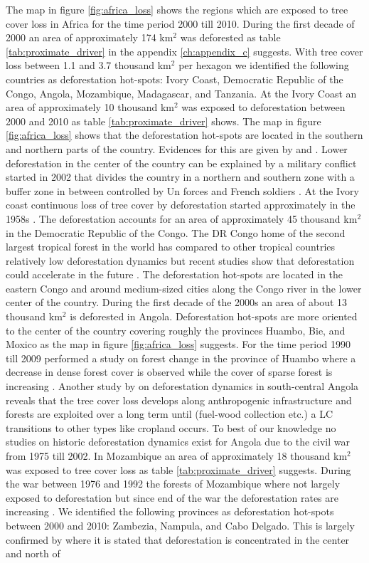 			The map in figure \ref{fig:africa_loss} shows the regions which are exposed to tree cover loss in Africa for the time period 2000 till 2010. During the first decade of 2000 an area of approximately 174 km$^2$ was deforested as table \ref{tab:proximate_driver} in the appendix \ref{ch:appendix_c} suggests. With tree cover loss between 1.1 and 3.7 thousand km$^2$ per hexagon we identified the following countries as deforestation hot-spots: Ivory Coast, Democratic Republic of the Congo, Angola, Mozambique, Madagascar, and Tanzania. At the Ivory Coast an area of approximately 10 thousand km$^2$ was exposed to deforestation between 2000 and 2010 as table \ref{tab:proximate_driver} shows. The map in figure \ref{fig:africa_loss} shows that the deforestation hot-spots are located in the southern and northern parts of the country. Evidences for this are given by \citet{Goetze2006} and \citet{Barima2016}. Lower deforestation in the center of the country can be explained by a military conflict started in 2002 that divides the country in a northern and southern zone with a buffer zone in between controlled by Un forces and French soldiers \citep{Barima2016}. At the Ivory coast continuous loss of tree cover by deforestation started approximately in the 1958s \citep{Chatelain1996}. The deforestation accounts for an area of approximately 45 thousand km$^2$ in the Democratic Republic of the Congo. The DR Congo home of the second largest tropical forest in the world has compared to other tropical countries relatively low deforestation dynamics but recent studies show that deforestation could accelerate in the future \citep{Ickowitz2015}. The deforestation hot-spots are located in the eastern Congo and around medium-sized cities along the Congo river in the lower center of the country. During the first decade of the 2000s an area of about 13 thousand km$^2$ is deforested in Angola. Deforestation hot-spots are more oriented to the center of the country covering roughly the provinces Huambo, Bie, and Moxico as the map in figure \ref{fig:africa_loss} suggests. For the time period 1990 till 2009 \citet{Cabral2011} performed a study on forest change in the province of Huambo where a decrease in dense forest cover is observed while the cover of sparse forest is increasing \citep{Cabral2011}. Another study by \citet{Schneibel2017} on deforestation dynamics in south-central Angola reveals that the tree cover loss develops along anthropogenic infrastructure and forests are exploited over a long term until (fuel-wood collection etc.) a \ac{LC} transitions to other types like cropland occurs. To best of our knowledge no studies on historic deforestation dynamics exist for Angola due to the civil war from 1975 till 2002. In Mozambique an area of approximately 18 thousand km$^2$ was exposed to tree cover loss as table \ref{tab:proximate_driver} suggests. During the war between 1976 and 1992 the forests of Mozambique where not largely exposed to deforestation but since end of the war the deforestation rates are increasing \citep{Sitoe2012}. We identified the following provinces as deforestation hot-spots between 2000 and 2010: Zambezia, Nampula, and Cabo Delgado. This is largely confirmed by \citeauthor{Sitoe2012} where it is stated that deforestation is concentrated in the center and north of 